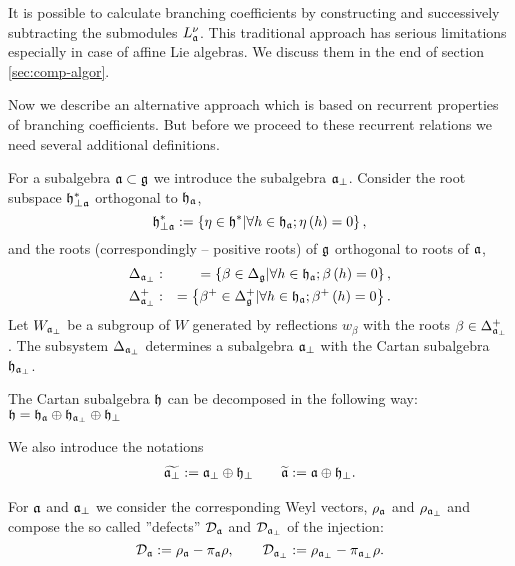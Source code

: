 It is possible to calculate branching coefficients by constructing and successively  subtracting the submodules $L^{\nu}_{\mathfrak{a}}$. 
This traditional approach has serious limitations especially in case of affine Lie algebras. We discuss them in the end of section \ref{sec:comp-algor}. 

Now we describe an alternative approach which is based on recurrent properties of branching coefficients. 
But before we proceed to these recurrent relations we need several additional definitions.

For a subalgebra $\mathfrak{a}\subset \mathfrak{g}$ we introduce the subalgebra
$\mathfrak{a}_{\bot}$. Consider the root subspace $\mathfrak{h}_{\perp \mathfrak{a}}^{\ast }$
orthogonal to $\mathfrak{h}_{\mathfrak{a}}$,
\begin{equation*}
\mathfrak{h}_{\perp \mathfrak{a}}^{\ast }:=\left\{ \eta \in \mathfrak{h}^{\ast }|\forall
h\in \mathfrak{h}_{\mathfrak{a}};\eta \left( h\right) =0\right\} ,
\end{equation*}
and the roots (correspondingly -- positive roots) of $\mathfrak{g}$ orthogonal
to roots of $\mathfrak{a}$,
\begin{eqnarray}
\Delta _{\afb} &:&=\left\{ \beta \in \Delta _{\gf}|\forall
h\in \hf_{\af};\beta \left( h\right) =0\right\} ,
\label{delta a ort} \\
\Delta _{\afb}^{+} &:&=\left\{ \beta ^{+}\in \Delta _{\gf%
}^{+}|\forall h\in \hf_{\af};\beta ^{+}\left( h\right) =0\right\} .
\notag
\end{eqnarray}
Let $W_{\mathfrak{a}_{\bot}}$ be a subgroup of $W$ generated by
reflections $w_{\beta }$ with the roots $\beta \in \Delta _{\mathfrak{a}_{\perp
}}^{+}$. The subsystem $\Delta _{\mathfrak{a}_{\bot}}$ determines a 
subalgebra $\mathfrak{a}_{\bot}$ with the Cartan subalgebra $\hf_{\af%
_{\perp }}$.

The Cartan subalgebra $\frak{h}$ can be decomposed in the following way:  $\frak{h}=\frak{\frak{h}_{\mathfrak{a}}}\oplus
\frak{h}_{\mathfrak{a}_{\bot}}\oplus \frak{h}_{\perp }$

We also introduce the notations
\begin{eqnarray}
\widetilde{\frak{a}_{\perp }} :=\frak{a}_{\perp }\oplus \frak{h}_{\perp }
\qquad
\widetilde{\frak{a}} :=\frak{a}\oplus \frak{h}_{\perp }.
\end{eqnarray}

For $\mathfrak{a}$ and $\mathfrak{a}_{\bot}$ we consider the
corresponding Weyl vectors, $\rho _{\mathfrak{a}}$ and $\rho _{\mathfrak{a}_{\perp
}} $ and compose the so called ''defects'' $\mathcal{D}_{\mathfrak{a}}$ and $\mathcal{%
D}_{\afb}$ of the injection:
\begin{equation}
\mathcal{D}_{\af}:=\rho _{\af}-\pi _{\af}\rho , \qquad
\mathcal{D}_{\afb}:=\rho _{\afb}-\pi _{\af%
_{\perp }}\rho .  \label{defect-ort}
\end{equation}

